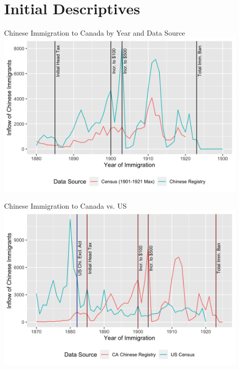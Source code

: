 \documentclass[pdf]{beamer}
\begin{document}
\section{Initial Descriptives}
\begin{frame}[label = yrimmchi]{Chinese Immigration to Canada by Year and Data Source}
    \centering
    \includegraphics[width = 0.9\textwidth]{../../figs/yrimmchi_maxes.png}
    \hyperlink{taxespaid}{}
    \hyperlink{taxbyyear}{}
    \hyperlink{dateimmchi}{}
    \hyperlink{yrimmchi_means}{}
    \hyperlink{events1912}{}
\end{frame}

\begin{frame}[label = yrimmchius]{Chinese Immigration to Canada vs. US}
    \centering
    \includegraphics[width = 0.9\textwidth]{../../figs/yrimmchi_us.png}
    \hyperlink{yrimm_us}{}
    \hyperlink{yrimmall}{}
\end{frame}
\end{document}
